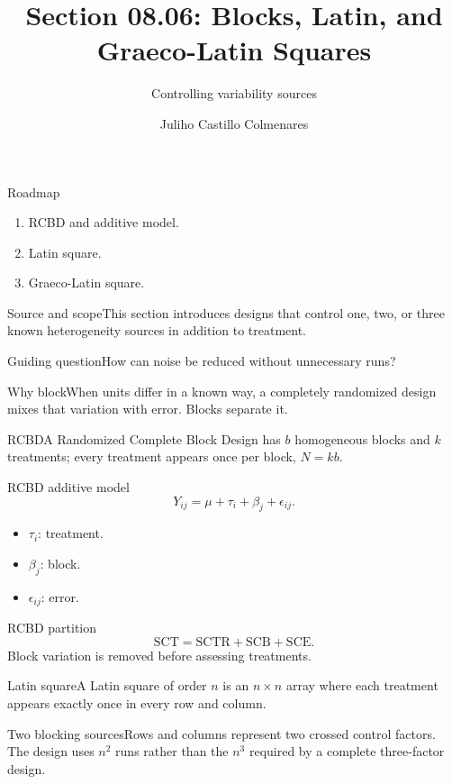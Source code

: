 \documentclass[10pt,aspectratio=169]{beamer}
\title[Blocks and Latin squares]{Section 08.06: Blocks, Latin, and Graeco-Latin Squares}\subtitle{Controlling variability sources}\author[J. Castillo Colmenares]{Juliho Castillo Colmenares}\institute{Tecnológico de Monterrey}\date{}
\begin{document}
\begin{frame}[plain]\titlepage\end{frame}
\begin{frame}{Roadmap}\small\begin{enumerate}\item RCBD and additive model.\item Latin square.\item Graeco-Latin square.\end{enumerate}\end{frame}
\begin{frame}{Source and scope}\small This section introduces designs that control one, two, or three known heterogeneity sources in addition to treatment.\begin{block}{Guiding question}How can noise be reduced without unnecessary runs?\end{block}\end{frame}
\begin{frame}{Why block}\small When units differ in a known way, a completely randomized design mixes that variation with error. Blocks separate it.\end{frame}
\begin{frame}{RCBD}\small A Randomized Complete Block Design has $b$ homogeneous blocks and $k$ treatments; every treatment appears once per block, $N=kb$.\end{frame}
\begin{frame}{RCBD additive model}\small\[Y_{ij}=\mu+\tau_i+\beta_j+\epsilon_{ij}.\]\begin{itemize}\item $\tau_i$: treatment.\item $\beta_j$: block.\item $\epsilon_{ij}$: error.\end{itemize}\end{frame}
\begin{frame}{RCBD partition}\small\[\mathrm{SCT}=\mathrm{SCTR}+\mathrm{SCB}+\mathrm{SCE}.\]Block variation is removed before assessing treatments.\end{frame}
\begin{frame}{Latin square}\small A Latin square of order $n$ is an $n\times n$ array where each treatment appears exactly once in every row and column.\end{frame}
\begin{frame}{Two blocking sources}\small Rows and columns represent two crossed control factors. The design uses $n^2$ runs rather than the $n^3$ required by a complete three-factor design.\end{frame}
\end{document}
